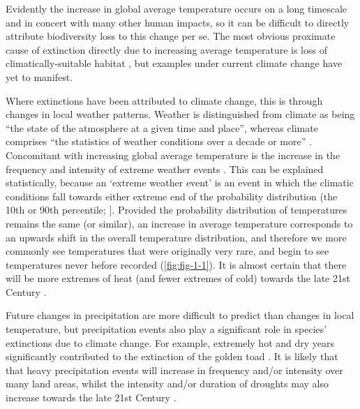 \documentclass[12pt,a4paper,]{report}
\theoremstyle{definition}
\theoremstyle{definition}
\theoremstyle{definition}
\theoremstyle{remark}
\begin{document}
Evidently the increase in global average temperature occurs on a long
timescale and in concert with many other human impacts, so it can be
difficult to directly attribute biodiversity loss to this change per se.
The most obvious proximate cause of extinction directly due to
increasing average temperature is loss of climatically-suitable habitat
\citep{thomas_extinction2004}, but examples under current climate change
have yet to manifest.

Where extinctions have been attributed to climate change, this is
through changes in local weather patterns. Weather is distinguished from
climate as being ``the state of the atmosphere at a given time and
place'', whereas climate comprises ``the statistics of weather
conditions over a decade or more'' \citep{ipcc2013}. Concomitant with
increasing global average temperature is the increase in the frequency
and intensity of extreme weather events \citep{ipcc2013}. This can be
explained statistically, because an `extreme weather event' is an event
in which the climatic conditions fall towards either extreme end of the
probability distribution (the 10th or 90th percentile;
\citet{ipcc2013}{]}. Provided the probability distribution of
temperatures remains the same (or similar), an increase in average
temperature corresponds to an upwards shift in the overall temperature
distribution, and therefore we more commonly see temperatures that were
originally very rare, and begin to see temperatures never before
recorded (\autoref{fig:fig-1-1}). It is almost certain that there will
be more extremes of heat (and fewer extremes of cold) towards the late
21st Century \citep{ipcc2013}.

Future changes in precipitation are more difficult to predict than
changes in local temperature, but precipitation events also play a
significant role in species' extinctions due to climate change. For
example, extremely hot and dry years significantly contributed to the
extinction of the golden toad \citep{pounds_biological1999}. It is
likely that that heavy precipitation events will increase in frequency
and/or intensity over many land areas, whilst the intensity and/or
duration of droughts may also increase towards the late 21st Century
\citep{ipcc2013}.
\end{document}

